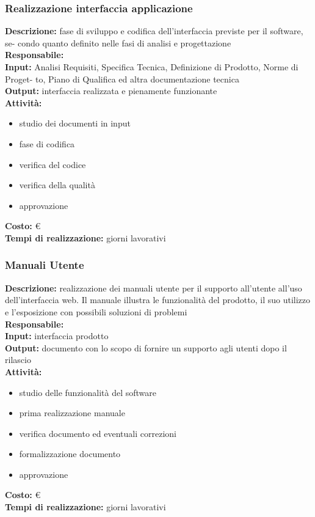\subsubsection{Realizzazione interfaccia applicazione}
\textbf{Descrizione:} fase di sviluppo e codifica dell'interfaccia previste per il software, se-
condo quanto definito nelle fasi di analisi e progettazione \\
\linebreak
\textbf{Responsabile:} \\
\linebreak
\textbf{Input:} Analisi Requisiti, Specifica Tecnica, Definizione di Prodotto, Norme di Proget-
to, Piano di Qualifica ed altra documentazione tecnica \\
\linebreak
\textbf{Output:} interfaccia realizzata e pienamente funzionante\\
\linebreak
\textbf{Attività:}
\begin{itemize}
\item studio dei documenti in input
\item fase di codifica
\item verifica del codice
\item verifica della qualità
\item approvazione
\end{itemize}
\textbf{Costo:} \euro \\
\textbf{Tempi di realizzazione:}  giorni lavorativi


\subsubsection{Manuali Utente}
\textbf{Descrizione:} realizzazione dei manuali utente per il supporto all’utente all'uso dell'interfaccia web. Il manuale illustra le funzionalità del prodotto, il suo utilizzo e l’esposizione con possibili soluzioni di problemi \\
\linebreak
\textbf{Responsabile:} \\
\linebreak
\textbf{Input:} interfaccia prodotto \\
\linebreak
\textbf{Output:} documento con lo scopo di fornire un supporto agli utenti dopo il rilascio\\
\linebreak
\textbf{Attività:}
\begin{itemize}
\item studio delle funzionalità del software
\item prima realizzazione manuale
\item verifica documento ed eventuali correzioni
\item formalizzazione documento
\item approvazione
\end{itemize}
\textbf{Costo:} \euro \\
\textbf{Tempi di realizzazione:}  giorni lavorativi


